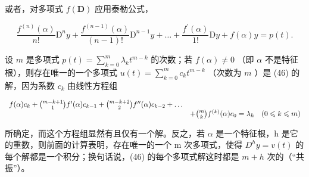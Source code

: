 或者，对多项式 \(f(\mathbf{D})\) 应用泰勒公式，

\[
\frac {f ^ {(n)} (\alpha)}{n !} \mathrm{D} ^ {n} y + \frac {f ^ {(n - 1)} (\alpha)}{(n - 1) !} \mathrm{D} ^ {n - 1} y + \dots + \frac {f ^ {\prime} (\alpha)}{1 !} \mathrm{D} y + f (\alpha) y = p (t).\tag{46}
\]

设 \(m\) 是多项式 \(p(t) = \sum_{k=0}^{m} \lambda_k t^{m-k}\) 的次数；若 \(f(\alpha) \neq 0\) （即 \(\alpha\) 不是特征根），则存在唯一的一个多项式 \(u(t) = \sum_{k=0}^{m} c_k t^{m-k}\) （次数为 \(m\) ）是 (46) 的解，因为系数 \(c_k\) 由线性方程组

\[
\begin{array}{r l} f (\alpha) c _ {k} + \binom {m - k + 1} {1} f ^ {\prime} (\alpha) c _ {k - 1} + \binom {m - k + 2} {2} f ^ {\prime \prime} (\alpha) c _ {k - 2} + \dots \\ & + \binom {m} {k} f ^ {(k)} (\alpha) c _ {0} = \lambda_ {k} \quad (0 \leqslant k \leqslant m) \end{array}
\]

所确定，而这个方程组显然有且仅有一个解。反之，若 \(\alpha\) 是一个特征根，h 是它的重数，则前面的计算表明，存在唯一的一个 m 次多项式，使得 \(D^{h}y = v(t)\) 的每个解都是一个积分；换句话说，(46) 的每个多项式解这时都是 \(m + h\) 次的（“共振”）。


